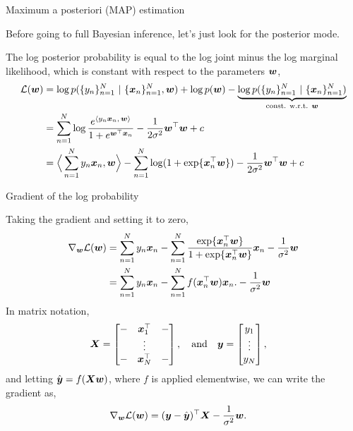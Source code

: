 \documentclass[aspectratio=169]{beamer}
\begin{document}
\begin{frame}{Maximum a posteriori (MAP) estimation}

Before going to full Bayesian inference, let's just look for the posterior mode.

The log posterior probability is equal to the log joint minus the log marginal likelihood, which is constant with respect to the parameters $\boldsymbol{w}$,
\begin{align}
    \mathcal{L}(\boldsymbol{w}) &= \log p(\{y_n\}_{n=1}^N ~\vert~ \{\boldsymbol{x}_n\}_{n=1}^N, \boldsymbol{w}) + \log p(\boldsymbol{w}) - \underbrace{\log p(\{y_n\}_{n=1}^N ~\vert~ \{\boldsymbol{x}_n\}_{n=1}^N)}_{\text{const. w.r.t. } \boldsymbol{w}} \\
    &= \sum_{n=1}^N \log \frac{e^{\langle y_n \boldsymbol{x}_n, \, \boldsymbol{w} \rangle}}{1+e^{\boldsymbol{w}^\top \boldsymbol{x}_n}} -\frac{1}{2\sigma^2} \boldsymbol{w}^\top \boldsymbol{w} + c\\
    &= \Big \langle \sum_{n=1}^N y_n \boldsymbol{x}_n, \boldsymbol{w} \Big \rangle 
    - \sum_{n=1}^N \log (1 + \exp \{\boldsymbol{x}_n^\top \boldsymbol{w} \}) - \frac{1}{2\sigma^2} \boldsymbol{w}^\top \boldsymbol{w} + c
\end{align}

\end{frame}

\begin{frame}{Gradient of the log probability}

Taking the gradient and setting it to zero,
\begin{align}
    \nabla_{\boldsymbol{w}} \mathcal{L}(\boldsymbol{w}) &= 
    \sum_{n=1}^N y_n \boldsymbol{x}_n - \sum_{n=1}^N 
    \frac{\exp\{\boldsymbol{x}_n^\top \boldsymbol{w}\}}{1 + \exp \{\boldsymbol{x}_n^\top \boldsymbol{w}\}} \boldsymbol{x}_n
    - \frac{1}{\sigma^2} \boldsymbol{w}
    \\
    &= \sum_{n=1}^N y_n \boldsymbol{x}_n - \sum_{n=1}^N 
    f(\boldsymbol{x}_n^\top \boldsymbol{w}) \boldsymbol{x}_n.
    - \frac{1}{\sigma^2} \boldsymbol{w}
\end{align}
In matrix notation, 
\begin{align}
    \boldsymbol{X} = \begin{bmatrix} - & \boldsymbol{x}_1^\top & - \\ & \vdots & \\ - & \boldsymbol{x}_N^\top & - \end{bmatrix}, \quad \text{and} \quad  &
    \boldsymbol{y} = \begin{bmatrix} y_1 \\ \vdots \\ y_N \end{bmatrix},
\end{align}
and letting $\hat{\boldsymbol{y}} = f(\boldsymbol{X} \boldsymbol{w})$, where $f$ is applied elementwise, we can write the gradient as,
\begin{align}
    \nabla_{\boldsymbol{w}} \mathcal{L}(\boldsymbol{w}) &= (\boldsymbol{y} - \hat{\boldsymbol{y}})^\top \boldsymbol{X} - \frac{1}{\sigma^2} \boldsymbol{w}.
\end{align}
\end{frame}
\end{document}
